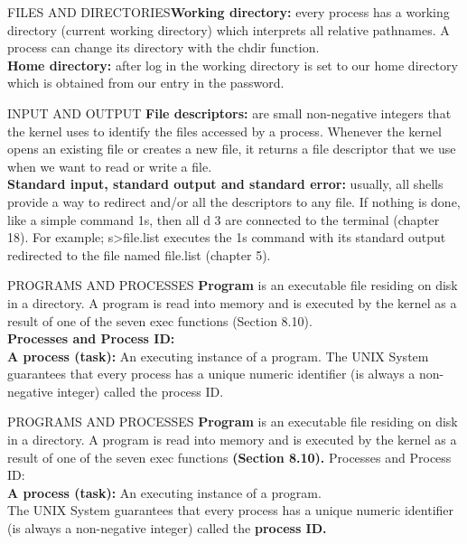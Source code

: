 \documentclass{beamer}
\begin{document}
\begin{frame}[t]{FILES AND DIRECTORIES}\textbf{Working directory:} every process has a working directory (current working directory) which interprets all relative pathnames. A process can change its directory with the chdir function.\\[10pt]
\textbf{Home directory:} after log in the working directory is set to our home directory which is obtained from our entry in the password.

\end{frame}

\begin{frame}[t]{INPUT AND OUTPUT}
\textbf{File descriptors:} are small non-negative integers that the kernel uses to identify the files accessed by a process. Whenever the kernel opens an existing file or creates a new file, it returns a file descriptor that we use when we want to read or write a file.\\[6pt]
\textbf{Standard input, standard output and standard error:} usually, all shells provide a way to redirect and/or all the descriptors to any file. If nothing is done, like a simple command 1s, then all d 3 are connected to the terminal (chapter 18). For example; s>file.list executes the 1s command with its standard output redirected to the file named file.list (chapter 5).

\end{frame}

\begin{frame}[t]{PROGRAMS AND PROCESSES}
\textbf{Program} is an executable file residing on disk in a directory. A program is read into memory and is executed by the kernel as a result of one of the seven exec functions (Section 8.10).\\[10pt]
\textbf{Processes and Process ID:}\\[6pt]
\textbf{A process (task):} An executing instance of a program. 
The UNIX System guarantees that every process has a unique numeric identifier (is always a non-negative integer) called the process ID. 

\end{frame}
\begin{frame}[t]{PROGRAMS AND PROCESSES}
\textbf{Program} is an executable file residing on disk in a directory. A program is read into memory and is executed by the kernel as a result of one of the seven exec functions \textbf{(Section 8.10).}
Processes and Process ID:\\[6pt]
\textbf{A process (task):} An executing instance of a program. \\[6pt]
The UNIX System guarantees that every process has a unique numeric identifier (is always a non-negative integer) called the \textbf{process ID.} 


\end{frame}
\end{document}
